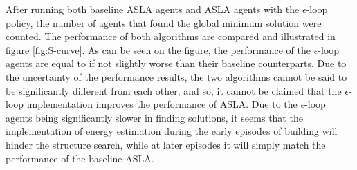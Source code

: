 After running both baseline ASLA agents and ASLA agents with the $\epsilon$-loop policy, the number of agents that found the global minimum solution were counted. The performance of both algorithms are compared and illustrated in figure \ref{fig:S-curve}. As can be seen on the figure, the performance of the $\epsilon$-loop agents are equal to if not slightly worse than their baseline counterparts. Due to the uncertainty of the performance results, the two algorithms cannot be said to be significantly different from each other, and so, it cannot be claimed that the $\epsilon$-loop implementation improves the performance of ASLA. Due to the $\epsilon$-loop agents being significantly slower in finding solutions, it seems that the implementation of energy estimation during the early episodes of building will hinder the structure search, while at later episodes it will simply match the performance of the baseline ASLA. 






